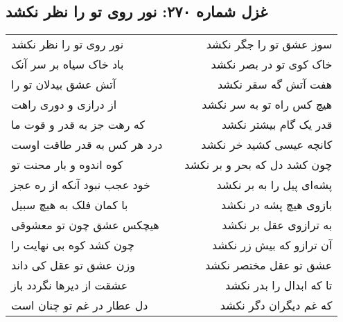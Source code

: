 \begin{center}
\section*{غزل شماره ۲۷۰: نور روی تو را نظر نکشد}
\label{sec:270}
\begin{longtable}{l p{0.5cm} r}
نور روی تو را نظر نکشد
&&
سوز عشق تو را جگر نکشد
\\
باد خاک سیاه بر سر آنک
&&
خاک کوی تو در بصر نکشد
\\
آتش عشق بیدلان تو را
&&
هفت آتش گه سقر نکشد
\\
از درازی و دوری راهت
&&
هیچ کس راه تو به سر نکشد
\\
که رهت جز به قدر و قوت ما
&&
قدر یک گام بیشتر نکشد
\\
درد هر کس به قدر طاقت اوست
&&
کانچه عیسی کشید خر نکشد
\\
کوه اندوه و بار محنت تو
&&
چون کشد دل که بحر و بر نکشد
\\
خود عجب نبود آنکه از ره عجز
&&
پشه‌ای پیل را به بر نکشد
\\
با کمان فلک به هیچ سبیل
&&
بازوی هیچ پشه در نکشد
\\
هیچکس عشق چون تو معشوقی
&&
به ترازوی عقل بر نکشد
\\
چون کشد کوه بی نهایت را
&&
آن ترازو که بیش زر نکشد
\\
وزن عشق تو عقل کی داند
&&
عشق تو عقل مختصر نکشد
\\
عشقت از دیرها نگردد باز
&&
تا که ابدال را بدر نکشد
\\
دل عطار در غم تو چنان است
&&
که غم دیگران دگر نکشد
\\
\end{longtable}
\end{center}
